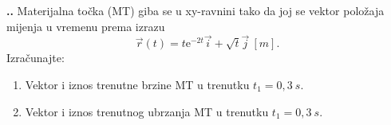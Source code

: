 
\noindent 
\textbf{
\thecjelina.\thezadatak.}
Materijalna točka (MT) giba se u xy-ravnini tako da joj se vektor položaja mijenja u
vremenu prema izrazu
$$
\vec{r}(t)=t\mathrm{e}^{-2t}\vec{i}+\sqrt{t}\vec{j}\ [m].
$$
Izračunajte: 
\begin{enumerate}[label=\alph*)]
 \item Vektor i iznos trenutne brzine MT u trenutku $t_1=0,3\ s$.
 \item  Vektor i iznos trenutnog ubrzanja MT u trenutku $t_1=0,3\ s$.

\end{enumerate}
